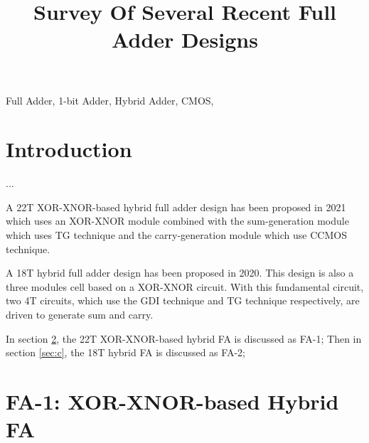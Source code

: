 \documentclass[conference]{IEEEtran}
\begin{document}
\title{Survey Of Several Recent Full Adder Designs}

\author{
}
\maketitle

\begin{abstract}
\end{abstract}

\begin{IEEEkeywords}
	Full Adder, 1-bit Adder, Hybrid Adder, CMOS,
\end{IEEEkeywords}

\section{Introduction}


...

A 22T XOR-XNOR-based hybrid full adder design \cite{20212210429416} has been proposed in 2021
which uses an XOR-XNOR module combined with the sum-generation module which uses TG technique and the carry-generation module which use CCMOS technique.

A 18T hybrid full adder design \cite{9339799} has been  proposed in 2020.
This design is also a three modules cell based on a XOR-XNOR circuit.
With this fundamental circuit, two 4T circuits, which use the GDI technique and TG technique respectively, are driven to generate sum and carry.

In section \ref{sec:b}, the 22T XOR-XNOR-based hybrid FA is discussed as FA-1;
Then in section \ref{sec:c}, the 18T hybrid FA is discussed as FA-2;


\section{FA-1: XOR-XNOR-based Hybrid FA}
\label{sec:b}
\end{document}
